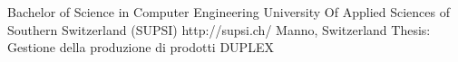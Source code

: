 \begin{CV}
    {Bachelor of Science in Computer Engineering}
    {University Of Applied Sciences of Southern Switzerland (SUPSI)}
    {http://supsi.ch/}
    {Manno, Switzerland}
    {Thesis: Gestione della produzione di prodotti DUPLEX}
\end{CV}